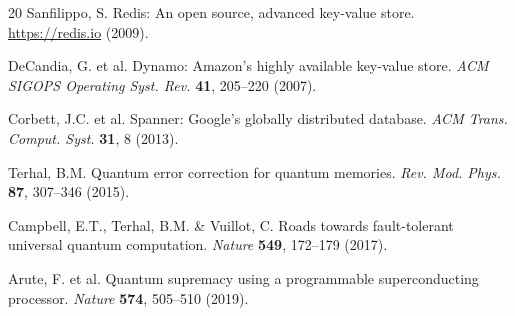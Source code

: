 \documentclass[12pt,a4paper]{article}
\theoremstyle{definition}
\begin{document}
\begin{thebibliography}{20}
Sanfilippo, S. Redis: An open source, advanced key-value store. \url{https://redis.io} (2009).

DeCandia, G. et al. Dynamo: Amazon's highly available key-value store. \textit{ACM SIGOPS Operating Syst. Rev.} \textbf{41}, 205--220 (2007).

Corbett, J.C. et al. Spanner: Google's globally distributed database. \textit{ACM Trans. Comput. Syst.} \textbf{31}, 8 (2013).

Terhal, B.M. Quantum error correction for quantum memories. \textit{Rev. Mod. Phys.} \textbf{87}, 307--346 (2015).

Campbell, E.T., Terhal, B.M. \& Vuillot, C. Roads towards fault-tolerant universal quantum computation. \textit{Nature} \textbf{549}, 172--179 (2017).

Arute, F. et al. Quantum supremacy using a programmable superconducting processor. \textit{Nature} \textbf{574}, 505--510 (2019).

\end{thebibliography}
\end{document}
